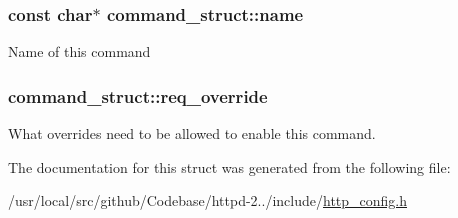 \subsubsection[{\texorpdfstring{name}{name}}]{\setlength{\rightskip}{0pt plus 5cm}const char$\ast$ command\+\_\+struct\+::name}\hypertarget{structcommand__struct_a51b094b470fe4ab204f47c29580e3170}{}\label{structcommand__struct_a51b094b470fe4ab204f47c29580e3170}
Name of this command 
\subsubsection[{\texorpdfstring{req\+\_\+override}{req_override}}]{ command\+\_\+struct\+::req\+\_\+override}\hypertarget{structcommand__struct_ad8b92b9bb5aa79f2cdeff6ab146c2e50}{}\label{structcommand__struct_ad8b92b9bb5aa79f2cdeff6ab146c2e50}
What overrides need to be allowed to enable this command. 

The documentation for this struct was generated from the following file\+:\begin{DoxyCompactItemize}
\item 
/usr/local/src/github/\+Codebase/httpd-\/2../include/\hyperlink{http__config_8h}{http\+\_\+config.\+h}\end{DoxyCompactItemize}
